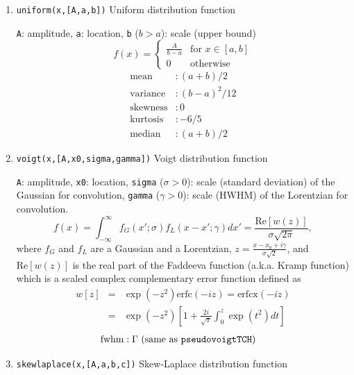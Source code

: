 \documentclass[reprint,showpacs,prb,nofootinbib,amsmath,amssymb]{revtex4-1}
\begin{document}
\begin{enumerate}
\item \verb|uniform(x,[A,a,b])| Uniform distribution function~\cite{uniform}

\verb|A|: amplitude, \verb|a|: location, \verb|b| ($b>a$): scale (upper bound)
\begin{equation}
f(x)=
\begin{cases}
\frac{A}{b-a} &\text{for }x\in[a,b] \\
0 & \text{otherwise} \nonumber
\end{cases}
\end{equation}
\begin{align}
	\mbox{mean} 		&: \mbox{$(a+b)/2$} \nonumber \\
	\mbox{variance}		&: \mbox{$(b-a)^2/12$} \nonumber \\
	\mbox{skewness}     &: \mbox{$0$} \nonumber \\
	\mbox{kurtosis}     &: \mbox{$-6/5$} \nonumber \\
	\mbox{median}       &: \mbox{$(a+b)/2$}  \nonumber
\end{align}

\item \verb|voigt(x,[A,x0,sigma,gamma])| Voigt distribution function~\cite{vogit,Faddeeva}

\verb|A|: amplitude, \verb|x0|: location, \verb|sigma| ($\sigma>0$): scale (standard deviation) of the Gaussian for convolution, \verb|gamma| ($\gamma>0$): scale (HWHM) of the Lorentzian for convolution.
\begin{equation}
f(x)=\int_{-\infty}^{\infty}f_G(x';\sigma)f_L(x-x';\gamma)dx'=\frac{\mathrm{Re}[w(z)]}{\sigma\sqrt{2\pi}},\nonumber
\end{equation}
where $f_G$ and $f_L$ are a Gaussian and a Lorentzian, $z=\frac{x-x_0+i\gamma}{\sigma\sqrt{2}}$, and $\mathrm{Re}[w(z)]$ is the real part of the Faddeeva function (a.k.a. Kramp function) which is a scaled complex complementary error function defined as
\begin{eqnarray}
w[z]&=&\exp(-z^2)\mathrm{erfc}(-iz)=\mathrm{erfcx}(-iz) \nonumber \\
&=&\exp(-z^2)\left[1+\frac{2i}{\sqrt{\pi}}\int_{0}^{z}\exp(t^2)dt\right] \nonumber
\end{eqnarray}
\begin{align}
	\mbox{fwhm} &: \mbox{$\Gamma$ (same as \texttt{pseudovoigtTCH})} \nonumber
\end{align}

\item \verb|skewlaplace(x,[A,a,b,c])| Skew-Laplace distribution function~\cite{McLaughlin,skewlaplace}


\end{enumerate}
\end{document}
